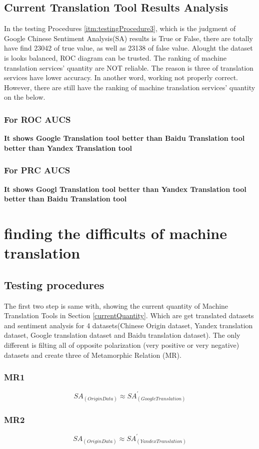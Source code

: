 \documentclass[conference]{IEEEtran}
\begin{document}
\begin{CJK*}{UTF8}{gbsn}
  \subsection{Current Translation Tool Results Analysis}
  In the testing Procedures \ref{itm:testingProcedure3}, which is the judgment of Google Chinese
    Sentiment Analysis(SA) results is True or False, there are totally have find
    23042 of true value, as well as 23138 of false value. Alought the dataset is
    looks balanced, ROC diagram can be trusted. The ranking of machine
    translation services' quantity are NOT reliable. The reason is three of
    translation services have lower accuracy. In another word, working not
    properly correct. However, there are still have the ranking of machine
    translation services' quantity on the below.
\subsubsection{For ROC AUCS}
\textbf{It shows Google Translation tool better than Baidu Translation tool better than Yandex Translation tool}
\subsubsection{For PRC AUCS}
\textbf{It shows Googl Translation tool better than Yandex Translation tool better than Baidu Translation tool}

\section{finding the difficults of machine translation}
\subsection{Testing procedures}
The first two step is same with, showing the current quantity of Machine
Translation Tools in Section \ref{currentQuantity}. Which are get translated
datasets and sentiment analysis for 4 datasets(Chinese Origin dataset, Yandex
translation dataset, Google translation dataset and Baidu translation dataset).
The only different is filting all of opposite polarization (very positive or
very negative) datasets and create three of Metamorphic Relation (MR).
\subsubsection{MR1}
$$SA_{(Origin Data)} \approx SA^{\prime}_{(Google Translation)}$$
\subsubsection{MR2}
$$SA_{(Origin Data)} \approx SA^{\prime}_{(Yandex Translation)}$$

\end{CJK*}
\end{document}

